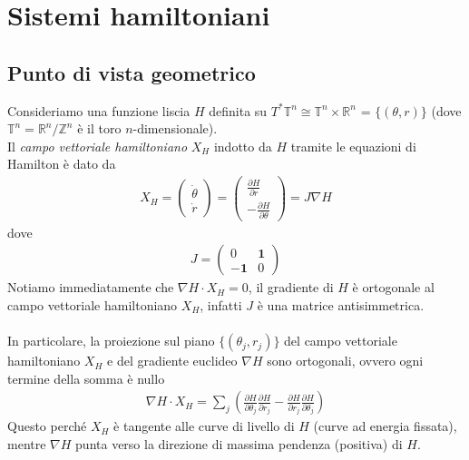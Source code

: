 \documentclass[twoside, 11pt]{amsbook}
\newcommand{\grad}{\nabla}
\newcommand{\0}{{(0)}}
\newcommand{\3}{{(3)}}
\theoremstyle{colonplain}
\theoremstyle{colondefinition}
\theoremstyle{colonremark}
\numberwithin{equation}{chapter}
\begin{document}
\chapter{Sistemi hamiltoniani}
\section{Punto di vista geometrico}
Consideriamo una funzione liscia $H$ definita su $ T^*\mathbb{T}^n \cong \mathbb{T}^n \times \mathbb{R}^n$ = $\{(\theta, r)\}$ (dove $\mathbb{T}^n = \mathbb{R}^n/\mathbb{Z}^n$ è il toro $n$-dimensionale). \\
Il \textit{campo vettoriale hamiltoniano} $X_H$ indotto da $H$ tramite le equazioni di Hamilton è dato da 
\begin{align}\label{HamVectField}
    X_H = \begin{pmatrix}
        \dot{\theta} \\
        \dot{r}
    \end{pmatrix} =
    \begin{pmatrix}
        \frac{\partial H}{\partial r} \\
        -\frac{\partial H}{\partial \theta}
    \end{pmatrix} = J\grad H 
\end{align}
dove
\begin{align}
    J = \begin{pmatrix}
        0 & \mathbf{1} \\
        -\mathbf{1} & 0
    \end{pmatrix}
\end{align}
Notiamo immediatamente che $\nabla H \cdot X_H = 0$, il gradiente di $H$ è ortogonale al campo vettoriale hamiltoniano $X_H$, infatti $J$ è una matrice antisimmetrica. \\ \\
In particolare, la proiezione sul piano $\{(\theta_j, r_j)\}$ del campo vettoriale hamiltoniano $X_H$ e del gradiente euclideo $\nabla H$ sono ortogonali, ovvero ogni termine della somma è nullo
\begin{align}
    \nabla H \cdot X_H = \sum_j\left(\frac{\partial H}{\partial \theta_j}\frac{\partial H}{\partial r_j} - \frac{\partial H}{\partial r_j}\frac{\partial H}{\partial \theta_j}\right)
\end{align}
Questo perché $X_H$ è tangente alle curve di livello di $H$ (curve ad energia fissata), mentre $\nabla H$ punta verso la direzione di massima pendenza (positiva) di $H$. \\ \\
\end{document}
